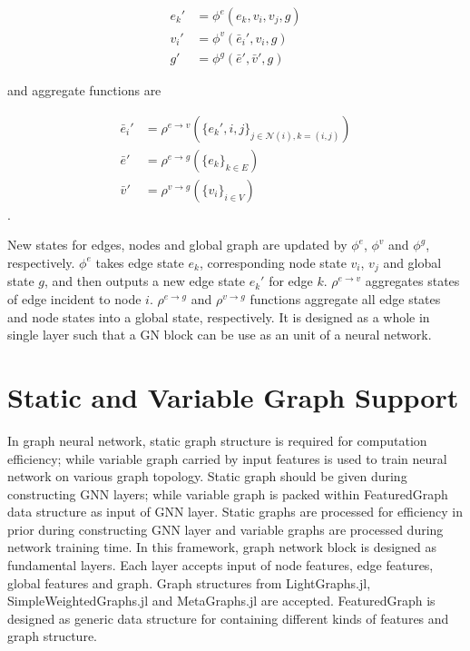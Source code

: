 \documentclass{juliacon}
\begin{document}
\[
    \begin{aligned}
    e_k' &= \phi^e (e_k, v_i, v_j, g) \\
    v_i' &= \phi^v (\bar{e}_i', v_i, g) \\
    g' &= \phi^g (\bar{e}', \bar{v}', g)
    \end{aligned}
\]

and aggregate functions are

\[
    \begin{aligned}
    \bar{e}_i' &= \rho^{e \rightarrow v} (\{e_k', i, j\}_{j \in \mathcal{N}(i),k = (i, j)}) \\
    \bar{e}' &= \rho^{e \rightarrow g} (\{e_k\}_{k \in E}) \\
    \bar{v}' &= \rho^{v \rightarrow g} (\{v_i\}_{i \in V})
    \end{aligned}
\].

New states for edges, nodes and global graph are updated by $\phi^e$, $\phi^v$ and $\phi^g$,
respectively. $\phi^e$ takes edge state $e_k$, corresponding node state $v_i$, $v_j$ and
global state $g$, and then outputs a new edge state $e_k'$ for edge $k$.
$\rho^{e \rightarrow v}$ aggregates states of edge incident to node $i$.
$\rho^{e \rightarrow g}$ and $\rho^{v \rightarrow g}$ functions aggregate all edge states and
node states into a global state, respectively. It is designed as a whole in single layer
such that a GN block can be use as an unit of a neural network.

\section{Static and Variable Graph Support}

In graph neural network, static graph structure is required for computation efficiency;
while variable graph carried by input features is used to train neural network on various
graph topology. Static graph should be given during constructing GNN layers; while variable
graph is packed within FeaturedGraph data structure as input of GNN layer. Static graphs are
processed for efficiency in prior during constructing GNN layer and variable graphs are
processed during network training time. In this framework, graph network block is designed as
fundamental layers. Each layer accepts input of node features, edge features, global features
and graph. Graph structures from LightGraphs.jl, SimpleWeightedGraphs.jl and MetaGraphs.jl
are accepted. FeaturedGraph is designed as generic data structure for containing different
kinds of features and graph structure.
\end{document}
